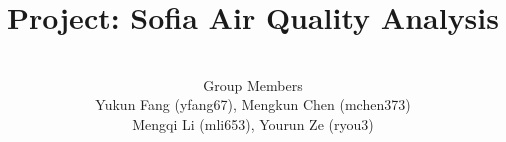 \documentclass[12pt]{beamer}
\begin{document}
\begin{CJK*}{GBK}{kai}

\title{Project: Sofia Air Quality Analysis}

\author{ \\[1em] Group Members \\[1em]
Yukun Fang (yfang67), Mengkun Chen (mchen373)\\ Mengqi Li (mli653), Yourun Ze (ryou3)}

\date{}

\begin{frame}
  \titlepage
\end{frame}






\end{CJK*}
\end{document}
